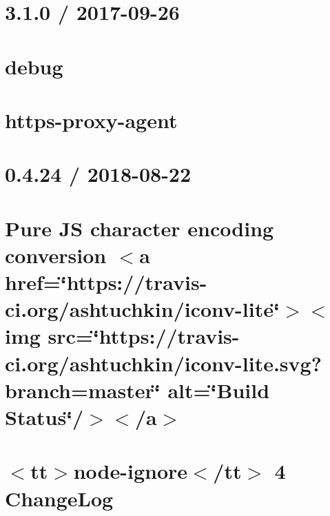 \let\mypdfximage\pdfximage\def\pdfximage{\immediate\mypdfximage}\documentclass[twoside]{book}
\newcommand{\+}{\discretionary{\mbox{\scriptsize$\hookleftarrow$}}{}{}}
\begin{document}
\chapter{3.1.0 / 2017-\/09-\/26}
\label{md_heap-visualizer_node_modules_https-proxy-agent_node_modules_debug__c_h_a_n_g_e_l_o_g}

\chapter{debug}
\label{md_heap-visualizer_node_modules_https-proxy-agent_node_modules_debug__r_e_a_d_m_e}

\chapter{https-\/proxy-\/agent}
\label{md_heap-visualizer_node_modules_https-proxy-agent__r_e_a_d_m_e}

\chapter{0.4.24 / 2018-\/08-\/22}
\label{md_heap-visualizer_node_modules_iconv-lite__changelog}

\chapter{Pure JS character encoding conversion $<$a href=\char`\"{}https\+://travis-\/ci.\+org/ashtuchkin/iconv-\/lite\char`\"{}$>$$<$img src=\char`\"{}https\+://travis-\/ci.\+org/ashtuchkin/iconv-\/lite.\+svg?branch=master\char`\"{} alt=\char`\"{}\+Build Status\char`\"{}/$>$$<$/a$>$}
\label{md_heap-visualizer_node_modules_iconv-lite__r_e_a_d_m_e}

\chapter{$<$tt$>$node-\/ignore$<$/tt$>$ 4 Change\+Log}
\label{md_heap-visualizer_node_modules_ignore__c_h_a_n_g_e_l_o_g}

\end{document}
